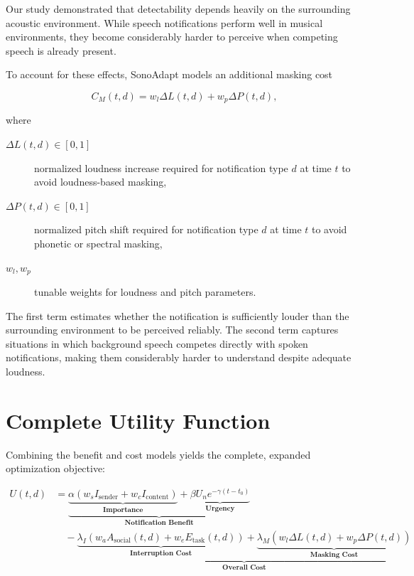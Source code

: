 Our study demonstrated that detectability depends heavily on the surrounding acoustic environment. While speech notifications perform well in musical environments, they become considerably harder to perceive when competing speech is already present.

To account for these effects, SonoAdapt models an additional masking cost

\begin{equation}
C_M(t,d)
=
w_l\Delta L(t,d)
+
w_p\Delta P(t,d),
\label{eq:masking}
\end{equation}

where

\begin{description}
\item[{$\Delta L(t,d) \in [0, 1]$}] normalized loudness increase required for notification type $d$ at time $t$ to avoid loudness-based masking,
\item[{$\Delta P(t,d) \in [0, 1]$}] normalized pitch shift required for notification type $d$ at time $t$ to avoid phonetic or spectral masking,
\item[$w_l, w_p$] tunable weights for loudness and pitch parameters.
\end{description}

The first term estimates whether the notification is sufficiently louder than the surrounding environment to be perceived reliably. The second term captures situations in which background speech competes directly with spoken notifications, making them considerably harder to understand despite adequate loudness.


\section{Complete Utility Function}

Combining the benefit and cost models yields the complete, expanded optimization objective:

\begin{equation}
\boxed{
\begin{aligned}
U(t,d) &= 
\underbrace{
  \underbrace{\alpha \left( w_sI_{\mathrm{sender}} + w_cI_{\mathrm{content}} \right)}_{\textbf{Importance}}
  +
  \underbrace{\beta U_ne^{-\gamma(t-t_0)}}_{\textbf{Urgency}}
}_{\textbf{Notification Benefit}} \\
&\quad - 
\underbrace{
  \underbrace{\lambda_I \left( w_aA_{\mathrm{social}}(t,d) + w_eE_{\mathrm{task}}(t,d) \right)}_{\textbf{Interruption Cost}}
  +
  \underbrace{\lambda_M \left( w_l\Delta L(t,d) + w_p\Delta P(t,d) \right)}_{\textbf{Masking Cost}}
}_{\textbf{Overall Cost}}
\end{aligned}
}
\label{eq:utility}
\end{equation}

